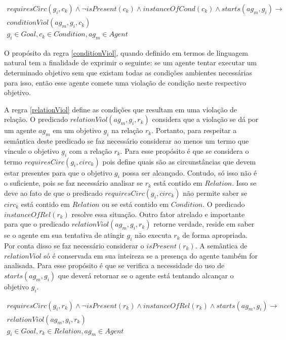 \begin{eqnarray}\label{conditionViol}\nonumber
	requiresCirc(g_i,c_k) \wedge \neg isPresent(c_k) \wedge instanceOfCond(c_k) \wedge starts(ag_m,g_i)  \to \\ \nonumber   
	conditionViol(ag_m,g_i,c_k) \nonumber \\  
    g_i \in Goal, c_k \in Condition, ag_m \in Agent
\end{eqnarray}

O propósito da regra \ref{conditionViol}, quando definido em termos de linguagem natural tem a finalidade de exprimir o seguinte: se um agente tentar executar um determinado objetivo sem que existam todas as condições ambientes necessárias para isso, então esse agente comete uma violação de condição neste respectivo objetivo. 

A regra \ref{relationViol} define as condições que resultam em uma violação de relação. O predicado $relationViol(ag_m,g_i,r_k)$ considera que a violação se dá por um agente $ag_m$ em um objetivo $g_i$ na relação $r_k$. Portanto, para respeitar a semântica deste predicado se faz necessário considerar ao menos um termo que vincule o objetivo $g_i$ com a relação $r_k$. Para esse propósito é que se considera o termo $requiresCirc(g_i,circ_k)$ pois define quais são as circunstâncias que devem estar presentes para que o objetivo $g_i$ possa ser alcançado. Contudo, só isso não é o suficiente, pois se faz necessário analisar se $r_k$ está contido em $Relation$. Isso se deve ao fato de que o predicado $requiresCirc(g_i,circ_k)$ não permite saber se $circ_k$ está contido em $Relation$ ou se está contido em $Condition$. O predicado $instanceOfRel(r_k)$ resolve essa situação. Outro fator atrelado e importante para que o predicado $relationViol(ag_m,g_i,r_k)$ retorne verdade, reside em saber se o agente em sua tentativa de atingir $g_i$ não executa $r_k$ de forma apropriada. Por conta disso se faz necessário considerar o $isPresent(r_k)$. A semântica de $relationViol$ só é conservada em sua inteireza se a presença do agente também for analisada. Para esse propósito é que se verifica a necessidade do uso de $starts(ag_m,g_i)$ que deverá retornar se o agente está tentando alcançar o objetivo $g_i$.   

\begin{eqnarray}\label{relationViol}\nonumber
	requiresCirc(g_i,r_k)\wedge \neg isPresent(r_k) \wedge instanceOfRel(r_k) \wedge starts(ag_m,g_i) \to \nonumber \\
	relationViol(ag_m,g_i,r_k) \nonumber \\  
    g_i \in Goal, r_k \in Relation, ag_m \in Agent
\end{eqnarray}

